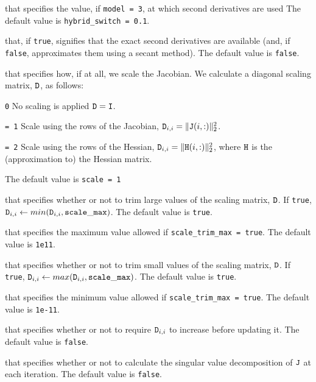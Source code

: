 \begin{description}
that specifies the value, if {\tt model = 3}, at which second derivatives are used
The default value is {\tt hybrid\_switch = 0.1}.

that, if {\tt true}, signifies that the exact second derivatives are available (and, if {\tt false}, approximates them using a secant method).
The default value is {\tt false}.

that specifies how, if at all, we scale the Jacobian.  We calculate a diagonal scaling matrix, ${\tt D}$, as follows: 
\begin{description}
\item{\tt 0} No scaling is applied ${\tt D} ={\tt I}$.
\item{\tt = 1} Scale using the rows of the Jacobian, \({\tt D}_{i,i} = \|{\tt J}(i,:)\|_2^2\).
\item{\tt = 2} Scale using the rows of the Hessian,  \({\tt D}_{i,i} = \|{\tt H}(i,:)\|_2^2\), where ${\tt H}$ is the (approximation to) the Hessian matrix.
\end{description}
The default value is {\tt scale = 1}

that specifies whether or not to trim large values of the scaling matrix, ${\tt D}$.
If {\tt true}, ${\tt D}_{i,i} \leftarrow min({\tt D}_{i,i}, {\tt scale\_max})$.
The default value is {\tt true}.

that specifies the maximum value allowed if {\tt scale\_trim\_max = true}.
The default value is {\tt 1e11}.

that specifies whether or not to trim small values of the scaling matrix, ${\tt D}$.
If {\tt true}, ${\tt D}_{i,i} \leftarrow max({\tt D}_{i,i}, {\tt scale\_max})$.
The default value is {\tt true}.

that specifies the minimum value allowed if {\tt scale\_trim\_max = true}.
The default value is {\tt 1e-11}.

that specifies whether or not to require ${\tt D}_{i,i}$ to increase before updating it.
The default value is {\tt false}.

that specifies whether or not to calculate the singular value decomposition of ${\tt J}$
at each iteration.  
The default value is {\tt false}.



\end{description}
